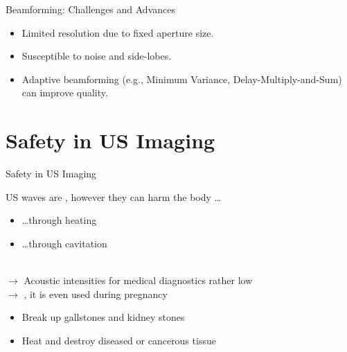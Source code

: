 \begin{frame}{Beamforming: Challenges and Advances}


\vspace{1em}

\begin{itemize}
    \item Limited resolution due to fixed aperture size.
    \item Susceptible to noise and side-lobes.
    \item Adaptive beamforming (e.g., Minimum Variance, Delay-Multiply-and-Sum) can improve quality.
\end{itemize}

\end{frame}


\section{Safety in US Imaging}


\begin{frame}{Safety in US Imaging}

    US waves are , however they can harm the body \dots
    \begin{itemize}
        \item \dots through heating\\
              \hspace{1cm}{$\rightarrow$ locally, proportional to absorbed acoustic intensity ($J$)}
        \item \dots through cavitation\\
              \hspace{1cm}{$\rightarrow$ emerging gas bubbles in low pressure phase of sound wave}\\
              \hspace{1cm}{$\rightarrow$ collapse at high pressure phase}
    \end{itemize}
    \vspace{.5cm}
    $\rightarrow$ Acoustic intensities for medical diagnostics rather low\\
    $\rightarrow$ , it is even used during pregnancy

    \begin{itemize}
        \item Break up gallstones and kidney stones
        \item Heat and destroy diseased or cancerous tissue
    \end{itemize}
\end{frame}



